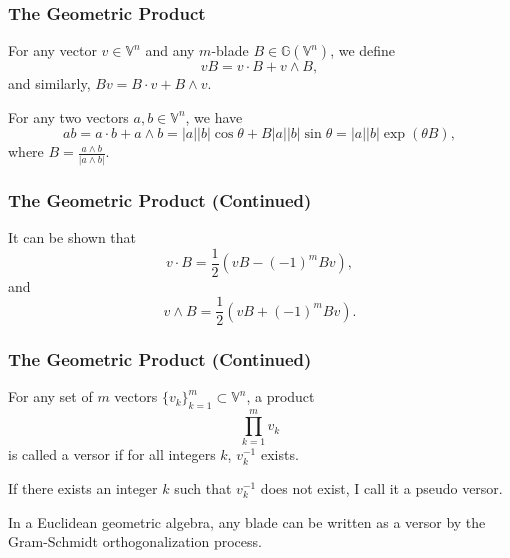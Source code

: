 \documentclass{beamer}
\newcommand{\G}{\mathbb{G}}
\newcommand{\V}{\mathbb{V}}
\begin{document}
\begin{frame}
\frametitle{The Geometric Product}
\begin{definition}
For any vector $v\in\V^n$ and any $m$-blade $B\in\G(\V^n)$, we define
\begin{equation*}
vB = v\cdot B + v\wedge B,
\end{equation*}
and similarly, $Bv = B\cdot v + B\wedge v$.
\end{definition}
\begin{example}
For any two vectors $a,b\in\V^n$, we have
\begin{equation*}
ab = a\cdot b + a\wedge b = |a||b|\cos\theta + B|a||b|\sin\theta = |a||b|\exp(\theta B),
\end{equation*}
where $B = \frac{a\wedge b}{|a\wedge b|}$.
\end{example}
\end{frame}

\begin{frame}
\frametitle{The Geometric Product (Continued)}
\begin{example}
It can be shown that
\begin{equation*}
v\cdot B = \frac{1}{2}(vB - (-1)^m Bv),
\end{equation*}
and
\begin{equation*}
v\wedge B = \frac{1}{2}(vB + (-1)^m Bv).
\end{equation*}
\end{example}
\end{frame}

%

\begin{frame}
\frametitle{The Geometric Product (Continued)}
\begin{definition}
For any set of $m$ vectors $\{v_k\}_{k=1}^m\subset\V^n$, a product
\begin{equation*}
\prod_{k=1}^m v_k
\end{equation*}
is called a versor if for all integers $k$, $v_k^{-1}$ exists.
\end{definition}
If there exists an integer $k$ such that $v_k^{-1}$ does not exist, I call it a pseudo versor.
\begin{lemma}
In a \alert{Euclidean} geometric algebra, any blade can be written as a versor
by the Gram-Schmidt orthogonalization process.
\end{lemma}
\end{frame}
\end{document}
